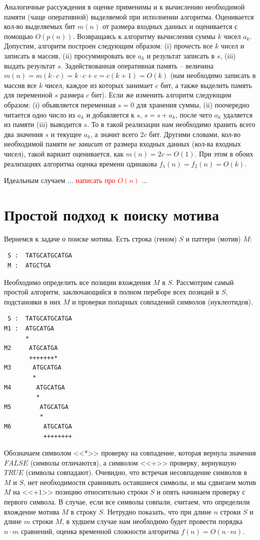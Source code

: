 \documentclass[letterpaper, 11pt]{article}
\begin{document}
Аналогичные рассуждения в оценке применимы и к вычислению необходимой памяти (чаще оперативной) выделяемой
при исполнении алгоритма. Оценивается кол-во выделяемых бит $m(n)$ от размера входных данных и оценивается с помощью
$O(p(n))$. Возвращаясь к алгоритму вычисления суммы $k$ чисел $a_k$. Допустим, алгоритм построен следующим образом: (i) прочесть все $k$ чисел и записать в массив, (ii) просуммировать все $a_k$ и результат записать в $s$, (iii) выдать результат $s$. Задействованная оперативная память -- величина $m(n) = m(k \cdot c) = k \cdot c + c = c(k + 1) = O(k)$ (нам необходимо записать в массив все $k$ чисел, каждое из которых занимает $c$ бит, а также выделить память для переменной $s$ размера $c$ бит). Если же изменить алгоритм следующим образом: (i) объявляется переменная $s = 0$ для хранения суммы, (ii) поочередно читается одно число из $a_k$ и добавляется к $s$, $s = s + a_k$, после чего $a_k$ удаляется из памяти (iii) выводится $s$. То в такой реализации нам необходимо хранить всего два значения $s$ и текущее $a_k$, а значит всего $2c$ бит. Другими словами, кол-во необходимой памяти \textit{не зависит} от размера входных данных (кол-ва входных чисел), такой вариант оценивается, как $m(n) = 2c = O(1)$. При этом в обоих реализациях алгоритма оценка времени одинакова $f_1(n) = f_2(n) = O(k)$.
\par
Идеальным случаем ... \textcolor{red}{написать про $O(n)$} ...
\section{Простой подход к поиску мотива}
\par
Вернемся к задаче о поиске мотива. Есть строка (геном) $S$ и паттерн (мотив) $M$:
\begin{verbatim}
 S :  TATGCATGCATGA
 M :  ATGCTGA
\end{verbatim}
\par
Необходимо определить все позиции вхождения $M$ в $S$. Рассмотрим самый простой алгоритм, заключающийся в полном переборе всех позиций в $S$, подстановки в них $M$ и проверки попарных совпадений символов (нуклеотидов).
\begin{verbatim}
 S :  TATGCATGCATGA
M1 :  ATGCATGA
      * 
M2     ATGCATGA
       +++++++*
M3      ATGCATGA
        *
M4       ATGCATGA
         *
M5        ATGCATGA
          *
M6         ATGCATGA
           ++++++++
\end{verbatim}
\par
Обозначаем символом <<*>> проверку на совпадение, которая вернула значения $FALSE$ (символы отличаются), а символом <<+>> проверку, вернувшую $TRUE$ (символы совпадают). Очевидно, что встречая несовпадение символов в $M$ и $S$, нет необходимости сравнивать оставшиеся символы, и мы сдвигаем мотив $M$ на <<$+1$>> позицию относительно строки $S$ и опять начинаем проверку с первого символа. В случае, если все символы совпали, считаем, что определили вхождение мотива $M$ в строку $S$. Нетрудно показать, что при длине $n$ строки $S$ и длине $m$ строки $M$, в худшем случае нам необходимо будет провести порядка $n\cdot m$ сравнений, оценка временной сложности алгоритма $f(n) = O(n \cdot m)$.
\end{document}
